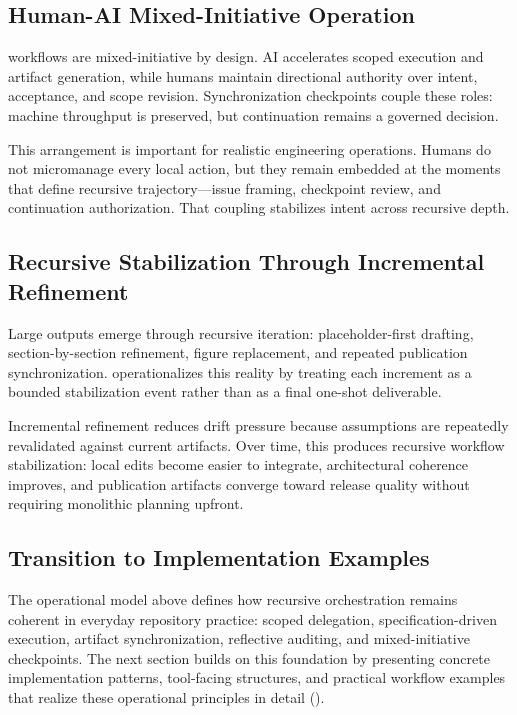 \subsection{Human-AI Mixed-Initiative Operation}

 workflows are mixed-initiative by design. AI accelerates scoped execution and artifact generation, while humans maintain directional authority over intent, acceptance, and scope revision. Synchronization checkpoints couple these roles: machine throughput is preserved, but continuation remains a governed decision.

This arrangement is important for realistic engineering operations. Humans do not micromanage every local action, but they remain embedded at the moments that define recursive trajectory---issue framing, checkpoint review, and continuation authorization. That coupling stabilizes intent across recursive depth.

\subsection{Recursive Stabilization Through Incremental Refinement}

Large outputs emerge through recursive iteration: placeholder-first drafting, section-by-section refinement, figure replacement, and repeated publication synchronization.  operationalizes this reality by treating each increment as a bounded stabilization event rather than as a final one-shot deliverable.

Incremental refinement reduces drift pressure because assumptions are repeatedly revalidated against current artifacts. Over time, this produces recursive workflow stabilization: local edits become easier to integrate, architectural coherence improves, and publication artifacts converge toward release quality without requiring monolithic planning upfront.

\subsection{Transition to Implementation Examples}

The operational model above defines how recursive orchestration remains coherent in everyday repository practice: scoped delegation, specification-driven execution, artifact synchronization, reflective auditing, and mixed-initiative checkpoints. The next section builds on this foundation by presenting concrete implementation patterns, tool-facing structures, and practical workflow examples that realize these operational principles in detail ().
